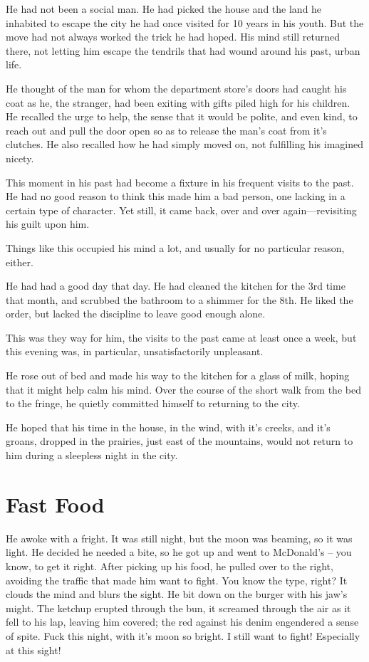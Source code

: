 \documentclass[fontsize=12pt,english]{scrreprt}
\begin{document}
He had not been a social man. He had picked the house and the land he
inhabited to escape the city he had once visited for 10 years in his
youth. But the move had not always worked the trick he had hoped. His
mind still returned there, not letting him escape the tendrils that
had wound around his past, urban life.

He thought of the man for whom the department store's doors had caught
his coat as he, the stranger, had been exiting with gifts piled high
for his children. He recalled the urge to help, the sense that it
would be polite, and even kind, to reach out and pull the door open so
as to release the man's coat from it's clutches. He also recalled how
he had simply moved on, not fulfilling his imagined nicety.

This moment in his past had become a fixture in his frequent visits to
the past. He had no good reason to think this made him a bad person,
one lacking in a certain type of character. Yet still, it came back,
over and over again—revisiting his guilt upon him.

Things like this occupied his mind a lot, and usually for no
particular reason, either.

He had had a good day that day. He had cleaned the kitchen for the 3rd
time that month, and scrubbed the bathroom to a shimmer for the
8th. He liked the order, but lacked the discipline to leave good
enough alone.

This was they way for him, the visits to the past came at least once a
week, but this evening was, in particular, unsatisfactorily
unpleasant.

He rose out of bed and made his way to the kitchen for a glass of
milk, hoping that it might help calm his mind. Over the course of the
short walk from the bed to the fringe, he quietly committed himself to
returning to the city.

He hoped that his time in the house, in the wind, with it's creeks,
and it's groans, dropped in the prairies, just east of the mountains,
would not return to him during a sleepless night in the city.

\newpage

\section{Fast Food}

He awoke with a fright. It was still night, but the moon was beaming,
so it was light. He decided he needed a bite, so he got up and went to
McDonald's -- you know, to get it right.  After picking up his food,
he pulled over to the right, avoiding the traffic that made him want
to fight. You know the type, right? It clouds the mind and blurs the
sight. He bit down on the burger with his jaw’s might. The ketchup
erupted through the bun, it screamed through the air as it fell to his
lap, leaving him covered; the red against his denim engendered a sense
of spite. Fuck this night, with it’s moon so bright. I still want to
fight! Especially at this sight!
\end{document}
